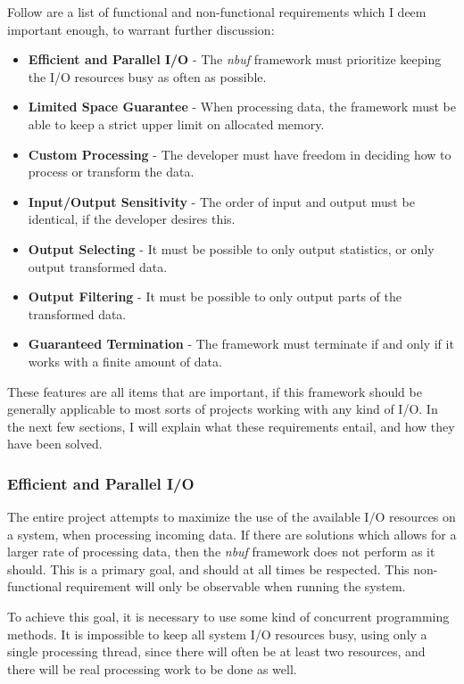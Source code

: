 \documentclass[a4paper]{article}
\newcommand{\nbuf}{\textit{nbuf} }
\begin{document}
Follow are a list of functional and non-functional requirements which I deem important enough, to warrant further discussion:

\begin{itemize}
\item \textbf{Efficient and Parallel I/O} - The \nbuf framework must prioritize keeping the I/O resources busy as often as possible.
\item \textbf{Limited Space Guarantee} - When processing data, the framework must be able to keep a strict upper limit on allocated memory.
\item \textbf{Custom Processing} - The developer must have freedom in deciding how to process or transform the data.
\item \textbf{Input/Output Sensitivity} - The order of input and output must be identical, if the developer desires this.
\item \textbf{Output Selecting} - It must be possible to only output statistics, or only output transformed data.
\item \textbf{Output Filtering} - It must be possible to only output parts of the transformed data.
\item \textbf{Guaranteed Termination} - The framework must terminate if and only if it works with a finite amount of data.
\end{itemize}

These features are all items that are important, if this framework should be generally applicable to most sorts of projects working with any kind of I/O. In the next few sections, I will explain what these requirements entail, and how they have been solved.

\subsubsection{Efficient and Parallel I/O}
The entire project attempts to maximize the use of the available I/O resources on a system, when processing incoming data. If there are solutions which allows for a larger rate of processing data, then the \nbuf framework does not perform as it should. This is a primary goal, and should at all times be respected. This non-functional requirement will only be observable when running the system.

To achieve this goal, it is necessary to use some kind of concurrent programming methods. It is impossible to keep all system I/O resources busy, using only a single processing thread, since there will often be at least two resources, and there will be real processing work to be done as well. 
\end{document}
